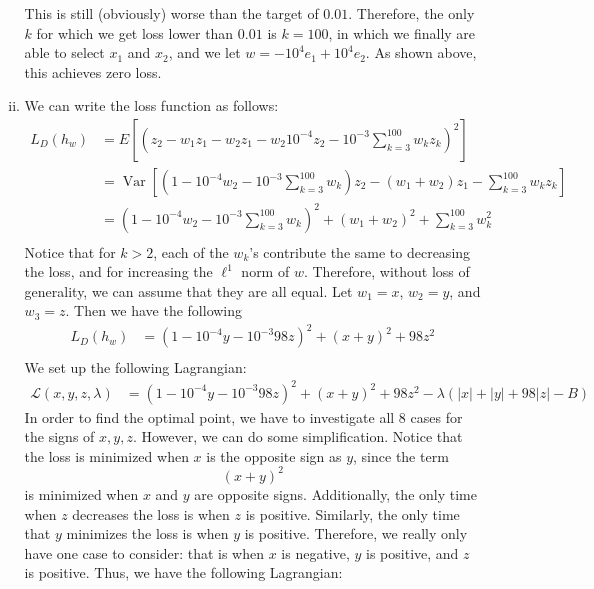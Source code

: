 \documentclass{amsart}
\DeclareMathOperator{\Var}{Var}  %
\theoremstyle{definition}
\begin{document}
\begin{enumerate}[(a)]
\begin{enumerate}[i.]
        This is still (obviously) worse than the target of $0.01$. 
        Therefore, the only $k$ for which we get loss lower than $0.01$ is $k = 100$, in which we finally are able to select $x_1$ and $x_2$, and we let $w = -10^4e_1 + 10^4 e_2$.
        As shown above, this achieves zero loss.
      \item 
        We can write the loss function as follows:
        \begin{align*}
          L_D(h_w) &= E\left[\left(z_2 - w_1 z_1 - w_2 z_1 - w_2 10^{-4} z_2 - 10^{-3}\sum_{k = 3}^{100} w_k z_k\right)^2\right]\\
          &= \Var \left[ \left( 1 - 10^{-4} w_2 - 10^{-3}\sum_{k = 3}^{100} w_k\right) z_2 - (w_1 + w_2) z_1 - \sum_{k = 3}^{100} w_k z_k\right]\\
          &= \left(1 - 10^{-4} w_2 - 10^{-3}\sum_{k = 3}^{100} w_k\right)^2 + (w_1 + w_2)^2 + \sum_{k = 3}^{100} w_k^2\\
        \end{align*} 
        Notice that for $k > 2$, each of the $w_k$'s contribute the same to decreasing the loss, and for increasing the $\ell^1$ norm of $w$. 
        Therefore, without loss of generality, we can assume that they are all equal. 
        Let $w_1 = x$, $w_2 = y$, and $w_3 = z$. Then we have the following 
        \begin{align*}
          L_D(h_w) &= \left(1 - 10^{-4} y - 10^{-3}98 z\right)^2 + (x + y)^2 + 98 z^2\\
        \end{align*}
        We set up the following Lagrangian:
        \begin{align*}
          \mathcal{L}(x, y, z, \lambda) &= \left(1 - 10^{-4} y - 10^{-3}98 z\right)^2 + (x + y)^2 + 98 z^2 - \lambda(|x| + |y| + 98|z| - B)
        \end{align*}
        In order to find the optimal point, we have to investigate all $8$ cases for the signs of $x, y, z$. 
        However, we can do some simplification. Notice that the loss is minimized when $x$ is the opposite sign as $y$, since the term
        \[(x + y)^2\]
        is minimized when $x$ and $y$ are opposite signs.
        Additionally, the only time when $z$ decreases the loss is when $z$ is positive. 
        Similarly, the only time that $y$ minimizes the loss is when $y$ is positive. Therefore, we really only have one case to consider: that is when $x$ is negative, $y$ is positive, and $z$ is positive.
        Thus, we have the following Lagrangian:
        \begin{align*}

\end{align*}
\end{enumerate}
\end{enumerate}
\end{document}
